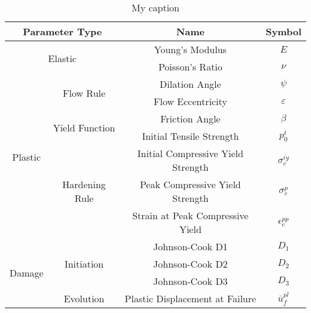 \begin{table}[]
\centering
\caption{My caption}
\label{my-label}
\begin{tabular}{@{}cccc@{}}
\toprule
\multicolumn{2}{c}{Parameter Type}                         & Name                               & Symbol            \\ \midrule
\multicolumn{2}{c}{\multirow{2}{*}{Elastic}}               & Young's Modulus                    & $E$               \\
\multicolumn{2}{c}{}                                       & Poisson's Ratio                    & $\nu$             \\ \cmidrule(r){1-2}
\multirow{7}{*}{Plastic} & \multirow{2}{*}{Flow Rule}      & Dilation Angle                     & $\psi$            \\
                         &                                 & Flow Eccentricity                  & $\varepsilon$     \\ \cmidrule(lr){2-2}
                         & \multirow{2}{*}{Yield Function} & Friction Angle                     & $\beta$           \\
                         &                                 & Initial Tensile Strength           & $p_0^t$           \\ \cmidrule(lr){2-2}
                         & \multirow{3}{*}{Hardening Rule} & Initial Compressive Yield Strength & $\sigma_c^{iy}$   \\
                         &                                 & Peak Compressive Yield Strength    & $\sigma_c^{p}$    \\
                         &                                 & Strain at Peak Compressive Yield   & $\epsilon_c^{pp}$ \\ \cmidrule(r){1-2}
\multirow{4}{*}{Damage}  & \multirow{3}{*}{Initiation}     & Johnson-Cook D1                    & $D_1$             \\
                         &                                 & Johnson-Cook D2                    & $D_2$             \\
                         &                                 & Johnson-Cook D3                    & $D_3$             \\ \cmidrule(lr){2-2}
                         & Evolution                       & Plastic Displacement at Failure    & $\bar{u}^{pl}_f$  \\ \bottomrule
\end{tabular}
\end{table}